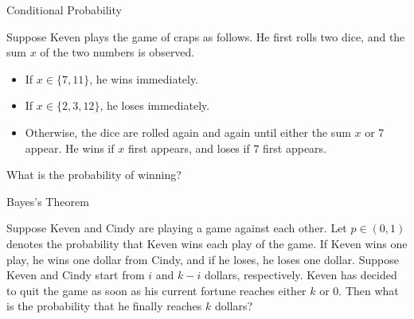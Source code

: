 \begin{frame}{Conditional Probability}

\justifying
{} Suppose Keven plays the game of craps as follows. He first rolls two dice, and the sum $x$ of the two numbers is observed.
\begin{itemize}
	\item If $x \in \{7, 11\}$, he wins immediately.
	\item If $x\in \{2, 3, 12\}$, he loses immediately.
	\item Otherwise, the dice are rolled again and again until either the sum $x$ or 7 appear. He wins if $x$ first appears, and loses if $7$ first appears.
\end{itemize}
What is the probability of winning?

\end{frame}


\begin{frame}{Bayes's Theorem}

\justifying
{} Suppose Keven and Cindy are playing a game against each other. Let $p\in (0, 1)$ denotes the probability that Keven wins each play of the game. If Keven wins one play, he wins one dollar from Cindy, and if he loses, he loses one dollar. Suppose Keven and Cindy start from $i$ and $k-i$ dollars, respectively. Keven has decided to quit the game as soon as his current fortune reaches either $k$ or 0. Then what is the probability that he finally reaches $k$ dollars?

\end{frame}
